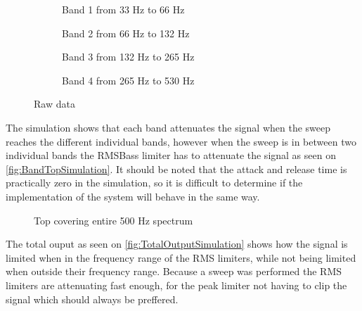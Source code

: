 \begin{figure}[H]
\centering
\begin{subfigure}[t]{0.49\textwidth}
    \centering
    
    \caption{Band 1 from 33 Hz to 66 Hz}
    \label{fig:Band1Simulation}
\end{subfigure}
\begin{subfigure}[t]{0.49\textwidth}
    \centering
    
    \caption{Band 2 from 66 Hz to 132 Hz}
    \label{fig:Band2Simulation}
\end{subfigure}
\begin{subfigure}[t]{0.49\textwidth}
    \centering
    
    \caption{Band 3 from 132 Hz to 265 Hz}
    \label{fig:Band3Simulation}
\end{subfigure}
\begin{subfigure}[t]{0.49\textwidth}
    \centering
    
    \caption{Band 4 from 265 Hz to 530 Hz}
    \label{fig:Band4Simulation}
\end{subfigure}
\caption{Raw data}
\label{fig:SimulationComparisson}
\end{figure} 

The simulation shows that each band attenuates the signal when the sweep reaches the different individual bands, however when the sweep is in between two individual bands the RMSBass limiter has to attenuate the signal as seen on \autoref{fig:BandTopSimulation}. It should be noted that the attack and release time is practically zero in the simulation, so it is difficult to determine if the implementation of the system will behave in the same way. 

\begin{figure}[H]
    \centering
    
    \caption{Top covering entire 500 Hz spectrum}
    \label{fig:BandTopSimulation}
\end{figure}

The total ouput as seen on \autoref{fig:TotalOutputSimulation} shows how the signal is limited when in the frequency range of the RMS limiters, while not being limited when outside their frequency range. Because a sweep was performed the RMS limiters are attenuating fast enough, for the peak limiter not having to clip the signal which should always be preffered.


